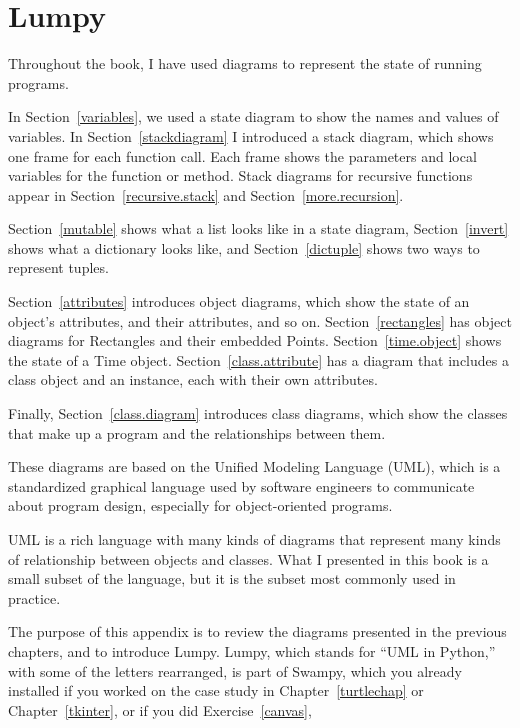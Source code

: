 \documentclass[10pt]{book}
\begin{document}
\chapter{Lumpy}
\label{lumpy}

Throughout the book, I have used diagrams to represent the state of
running programs.

In Section~\ref{variables}, we used a state diagram to show the names
and values of variables.  In Section~\ref{stackdiagram} I introduced a
stack diagram, which shows one frame for each function call.  Each
frame shows the parameters and local variables for the function or
method.  Stack diagrams for recursive functions appear in
Section~\ref{recursive.stack} and Section~\ref{more.recursion}.
 
 

Section~\ref{mutable} shows what a list looks like in a state diagram,
Section~\ref{invert} shows what a dictionary looks like, and
Section~\ref{dictuple} shows two ways to represent tuples.

Section~\ref{attributes} introduces object diagrams, which show the
state of an object's attributes, and their attributes, and so on.
Section~\ref{rectangles} has object diagrams for Rectangles and
their embedded Points.  Section~\ref{time.object} shows the state
of a Time object.
Section~\ref{class.attribute} has a diagram that includes a class
object and an instance, each with their own attributes.

Finally, Section~\ref{class.diagram} introduces class diagrams,
which show the classes that make up a program and the relationships
between them.

These diagrams are based on the Unified Modeling Language (UML), which
is a standardized graphical language used by software engineers
to communicate about program design, especially for object-oriented
programs.

UML is a rich language with many kinds of diagrams that represent
many kinds of relationship between objects and classes.  What I presented
in this book is a small subset of the language, but it is the subset
most commonly used in practice.

The purpose of this appendix is to review the diagrams presented in
the previous chapters, and to introduce Lumpy.  Lumpy, which stands
for ``UML in Python,'' with some of the letters rearranged, is part of
Swampy, which you already installed if you worked on the case study in
Chapter~\ref{turtlechap} or Chapter~\ref{tkinter}, or if you did
Exercise~\ref{canvas},
\end{document}

